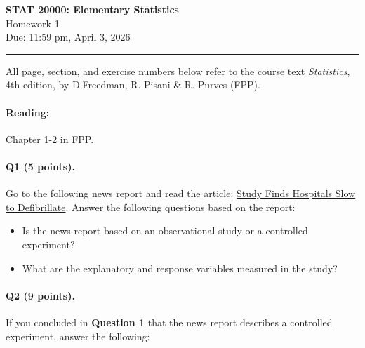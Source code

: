 \documentclass[11pt]{article}
\newcommand{\course}{STAT 20000: Elementary Statistics}
\newcommand{\hwtitle}{Homework 1}
\newcommand{\duedate}{Due: 11:59 pm, April 3, 2026}
\newcounter{question}
\begin{document}
\begin{center}
    {\Large \textbf{\course}}\\
    {\large \hwtitle}\\
    \duedate\\
    \vspace{0.5em}
\end{center}

\hrule
\vspace{1em}


\noindent All page, section, and exercise numbers below refer to the course text \textit{Statistics}, 4th edition, by D.Freedman, R. Pisani \& R. Purves (FPP).

\paragraph{Reading: }Chapter 1-2 in FPP.

\paragraph{Q1 (5 points).} Go to the following news report and read the article:
\href{https://www.latimes.com/archives/la-xpm-2008-jan-03-sci-heart3-story.html}{Study Finds Hospitals Slow to Defibrillate}. Answer the following questions based on the report:

\begin{itemize}
    \item Is the news report based on an observational study or a controlled experiment?
    \item What are the explanatory and response variables measured in the study?
\end{itemize}

\paragraph{Q2 (9 points).} If you concluded in \textbf{Question 1} that the news report describes a controlled experiment, answer the following:
\end{document}
